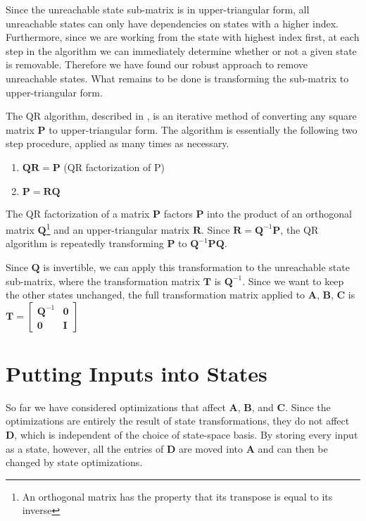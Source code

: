     Since the unreachable state sub-matrix is in upper-triangular
form, all unreachable states can only have dependencies on states
with a higher index. Furthermore, since we are working from the
state with highest index first, at each step in the algorithm we
can immediately determine whether or not a given state is
removable. Therefore we have found our robust approach to remove
unreachable states. What remains to be done is transforming the
sub-matrix to upper-triangular form.

    The QR algorithm, described in \cite{Trefethen}, is an iterative method of
converting any square matrix $\mathbf{P}$ to upper-triangular
form. The algorithm is essentially the following two step
procedure, applied as many times as necessary.
\begin{enumerate}
\item $\mathbf{Q} \mathbf{R} = \mathbf{P}$   (QR factorization of
P)

\item $\mathbf{P} = \mathbf{R} \mathbf{Q}$
\end{enumerate}

    The QR factorization of a matrix $\mathbf{P}$ factors
$\mathbf{P}$ into the product of an orthogonal matrix
$\mathbf{Q}$\footnote{An orthogonal matrix has the property that
its transpose is equal to its inverse} and an upper-triangular
matrix $\mathbf{R}$. Since $\mathbf{R} = \mathbf{Q}^{-1}
\mathbf{P}$, the QR algorithm is repeatedly transforming
$\mathbf{P}$ to $\mathbf{Q}^{-1} \mathbf{P} \mathbf{Q}$.

    Since $\mathbf{Q}$ is invertible, we can apply this
transformation to the unreachable state sub-matrix, where the
transformation matrix $\mathbf{T}$ is $\mathbf{Q}^{-1}$. Since we
want to keep the other states unchanged, the full transformation
matrix applied to $\mathbf{A}$, $\mathbf{B}$, $\mathbf{C}$ is
$\mathbf{T} = \left [ \begin{array} {cc} \mathbf{Q}^{-1} &
\mathbf{0} \\ \mathbf{0} & \mathbf{I} \end{array} \right ]$

\section{Putting Inputs into States}

    So far we have considered optimizations that affect $\mathbf{A}$,
$\mathbf{B}$, and $\mathbf{C}$. Since the optimizations are
entirely the result of state transformations, they do not affect
$\mathbf{D}$, which is independent of the choice of state-space
basis. By storing every input as a state, however, all the entries
of $\mathbf{D}$ are moved into $\mathbf{A}$ and can then be
changed by state optimizations.

